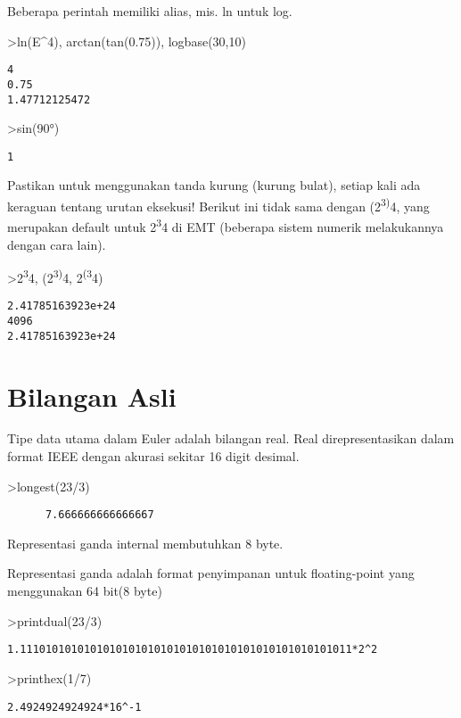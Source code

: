 \documentclass[
]{book}
\begin{document}
Beberapa perintah memiliki alias, mis. ln untuk log.

\textgreater ln(E\^{}4), arctan(tan(0.75)), logbase(30,10)

\begin{verbatim}
4
0.75
1.47712125472
\end{verbatim}

\textgreater sin(90°)

\begin{verbatim}
1
\end{verbatim}

Pastikan untuk menggunakan tanda kurung (kurung bulat), setiap kali ada keraguan tentang urutan eksekusi! Berikut ini tidak sama dengan (2\textsuperscript{3)}4, yang merupakan default untuk 2\textsuperscript{3}4 di EMT (beberapa sistem numerik melakukannya dengan cara lain).

\textgreater2\textsuperscript{3}4, (2\textsuperscript{3)}4, 2\textsuperscript{(3}4)

\begin{verbatim}
2.41785163923e+24
4096
2.41785163923e+24
\end{verbatim}

\section{Bilangan Asli}\label{bilangan-asli}

Tipe data utama dalam Euler adalah bilangan real. Real direpresentasikan dalam format IEEE dengan akurasi sekitar 16 digit desimal.

\textgreater longest(23/3)

\begin{verbatim}
      7.666666666666667 
\end{verbatim}

Representasi ganda internal membutuhkan 8 byte.

Representasi ganda adalah format penyimpanan untuk floating-point yang menggunakan 64 bit(8 byte)

\textgreater printdual(23/3)

\begin{verbatim}
1.1110101010101010101010101010101010101010101010101011*2^2
\end{verbatim}

\textgreater printhex(1/7)

\begin{verbatim}
2.4924924924924*16^-1
\end{verbatim}
\end{document}
